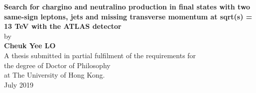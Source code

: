 {}

\begin{center}
    \large
        \hfill
        \vfill
    \begingroup
\huge\textbf{Search for chargino and neutralino production in final states with two same-sign leptons, jets and missing transverse momentum at sqrt(s) = 13 TeV with the ATLAS detector} \\
        \bigskip
    \endgroup
    by\\
    \bigskip
    \Large\textbf{Cheuk Yee LO}\\
    \vfill
    \vfill
    \vfill
{\normalsize
A thesis submitted in partial fulfilment of the requirements for\\
the degree of Doctor of Philosophy\\
at The University of Hong Kong.\\
    \bigskip
July 2019}
    \vfill
\end{center}
